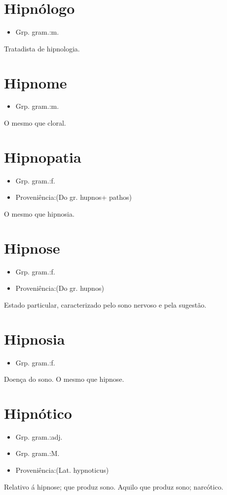 \documentclass{article}
\begin{document}
\section{Hipnólogo}
\begin{itemize}
\item {Grp. gram.:m.}
\end{itemize}
Tratadista de hipnologia.
\section{Hipnome}
\begin{itemize}
\item {Grp. gram.:m.}
\end{itemize}
O mesmo que \textunderscore cloral\textunderscore .
\section{Hipnopatia}
\begin{itemize}
\item {Grp. gram.:f.}
\end{itemize}
\begin{itemize}
\item {Proveniência:(Do gr. \textunderscore hupnos\textunderscore  + \textunderscore pathos\textunderscore )}
\end{itemize}
O mesmo que \textunderscore hipnosia\textunderscore .
\section{Hipnose}
\begin{itemize}
\item {Grp. gram.:f.}
\end{itemize}
\begin{itemize}
\item {Proveniência:(Do gr. \textunderscore hupnos\textunderscore )}
\end{itemize}
Estado particular, caracterizado pelo sono nervoso e pela sugestão.
\section{Hipnosia}
\begin{itemize}
\item {Grp. gram.:f.}
\end{itemize}
Doença do sono.
O mesmo que \textunderscore hipnose\textunderscore .
\section{Hipnótico}
\begin{itemize}
\item {Grp. gram.:adj.}
\end{itemize}
\begin{itemize}
\item {Grp. gram.:M.}
\end{itemize}
\begin{itemize}
\item {Proveniência:(Lat. \textunderscore hypnoticus\textunderscore )}
\end{itemize}
Relativo á hipnose; que produz sono.
Aquilo que produz sono; narcótico.
\end{document}
